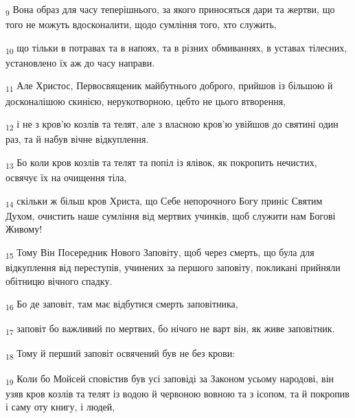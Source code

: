 \begin{tcolorbox}
\textsubscript{9} Вона образ для часу теперішнього, за якого приносяться дари та жертви, що того не можуть вдосконалити, щодо сумління того, хто служить,
\end{tcolorbox}
\begin{tcolorbox}
\textsubscript{10} що тільки в потравах та в напоях, та в різних обмиваннях, в уставах тілесних, установлено їх аж до часу направи.
\end{tcolorbox}
\begin{tcolorbox}
\textsubscript{11} Але Христос, Первосвященик майбутнього доброго, прийшов із більшою й досконалішою скинією, нерукотворною, цебто не цього втворення,
\end{tcolorbox}
\begin{tcolorbox}
\textsubscript{12} і не з кров'ю козлів та телят, але з власною кров'ю увійшов до святині один раз, та й набув вічне відкуплення.
\end{tcolorbox}
\begin{tcolorbox}
\textsubscript{13} Бо коли кров козлів та телят та попіл із ялівок, як покропить нечистих, освячує їх на очищення тіла,
\end{tcolorbox}
\begin{tcolorbox}
\textsubscript{14} скільки ж більш кров Христа, що Себе непорочного Богу приніс Святим Духом, очистить наше сумління від мертвих учинків, щоб служити нам Богові Живому!
\end{tcolorbox}
\begin{tcolorbox}
\textsubscript{15} Тому Він Посередник Нового Заповіту, щоб через смерть, що була для відкуплення від переступів, учинених за першого заповіту, покликані прийняли обітницю вічного спадку.
\end{tcolorbox}
\begin{tcolorbox}
\textsubscript{16} Бо де заповіт, там має відбутися смерть заповітника,
\end{tcolorbox}
\begin{tcolorbox}
\textsubscript{17} заповіт бо важливий по мертвих, бо нічого не варт він, як живе заповітник.
\end{tcolorbox}
\begin{tcolorbox}
\textsubscript{18} Тому й перший заповіт освячений був не без крови:
\end{tcolorbox}
\begin{tcolorbox}
\textsubscript{19} Коли бо Мойсей сповістив був усі заповіді за Законом усьому народові, він узяв кров козлів та телят із водою й червоною вовною та з ісопом, та й покропив і саму оту книгу, і людей,
\end{tcolorbox}
